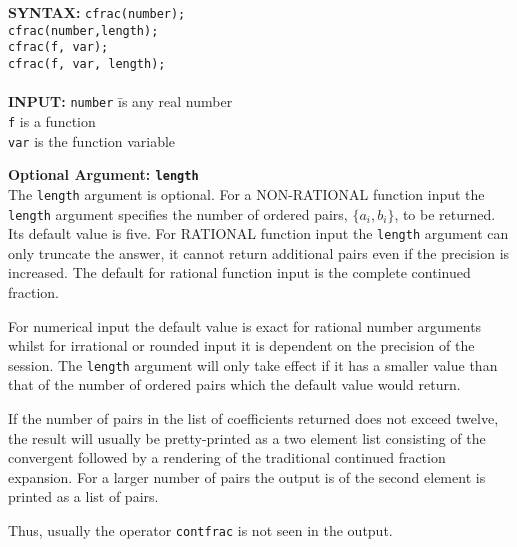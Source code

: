 \begin{tabbing}
{\bf SYNTAX:} \hspace{5mm} 
\= {\tt cfrac(number);}\\
\> {\tt cfrac(number,length);}\\
\> {\tt cfrac(f, var);}\\
\> {\tt cfrac(f, var, length);}\\ \\

{\bf INPUT:}
\> {\tt number} \hspace{3mm} \= is any real number\\
\> {\tt f}                   \> is a function\\
\> {\tt var}                 \> is the function variable\\
\end{tabbing}

{\bf Optional Argument: {\tt length}}\\
The \texttt{length} argument is optional. 
For a NON-RATIONAL function input the \texttt{length} argument specifies
the number of ordered pairs, $\{a_i,b_i\}$, to be 
returned. Its default value is five.
For RATIONAL function input the
\texttt{length} argument can only truncate the answer, it cannot
return additional pairs even if the precision is increased.
The default for rational function input is the complete continued
fraction.

For numerical input the default value is exact for
rational number arguments whilst for irrational or rounded input it is
dependent on the precision of the session. The
\texttt{length} argument will only take effect if it has a smaller
value than that of the number of ordered pairs which the default
value would return.

If the number of pairs in the list of coefficients returned does not exceed
twelve, the result will usually be pretty-printed as a two element list
consisting of the convergent followed by a rendering of the traditional
continued fraction expansion. For a larger number of pairs the output is
of the second element is printed as a list of pairs.

Thus, usually the operator \texttt{contfrac} is not seen in the output.

